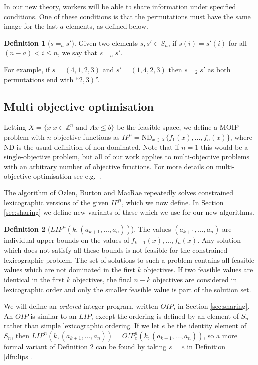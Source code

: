 \documentclass{amsart}
\theoremstyle{definition}
\newtheorem{dfn}{Definition}
\begin{document}
In our new theory, workers will be able to share information under specified conditions.
One of these conditions is that the permutations must have the same image for the last $a$ elements, as defined below.
\begin{dfn}[$s =_a s'$]
  Given two elements $s, s' \in S_n$, if $s(i) = s'(i)$ for all $(n-a) < i \leq n$, we say that $s =_a s'$.
\end{dfn}
For example, if $s = (4,1,2,3)$ and $s' = (1,4,2,3)$ then $s =_2 s'$ as both permutations end with ``$\left. 2,3\right)$''.

\subsection{Multi objective optimisation}

Letting $X = \{x | x \in {\ensuremath{\mathbb{Z}}}^n \text{ and } Ax \leq b\}$ be the feasible space, we define
a MOIP problem with $n$ objective functions as ${I\!P}^n = \text{ND}_{x\in X} \{f_1(x),\dots,f_n(x)\}$,
where ND is the usual definition of non-dominated.
Note that if $n=1$ this would be a single-objective problem, but all of our work applies to multi-objective problems with an arbitrary number of objective functions.
For more details on multi-objective optimisation see e.g.\ \cite{Przybylski2017,Ehrgott2000Survey}.

The algorithm of Ozlen, Burton and MacRae \cite{Ozlen2014moipaira} repeatedly solves constrained lexicographic versions of the given ${I\!P}^n$, which we now define.
In Section \ref{sec:sharing} we define new variants of these which we use for our new algorithms.

\begin{dfn}[${LI\!P}^n(k, (a_{k+1},\dots,a_n))$]\label{dfn:lip}
The values $(a_{k+1},\dots,a_n)$ are individual upper bounds on the values of $f_{k+1}(x),\dots,f_n(x)$.
Any solution which does not satisfy all these bounds is not feasible for the constrained lexicographic problem.
The set of solutions to such a problem contains all feasible values which are not dominated in the first $k$ objectives.
If two feasible values are identical in the first $k$ objectives, the final $n-k$ objectives are considered in lexicographic order and only the smaller feasible value is part of the solution set.
\end{dfn}

We will define an {\em ordered} integer program, written ${O\!I\!P}$, in Section \ref{sec:sharing}.
An ${O\!I\!P}$ is similar to an ${LI\!P}$, except the ordering is defined by an element of $S_n$ rather than simple lexicographic ordering.
If we let $e$ be the identity element of $S_n$, then 
${LI\!P}^n(k, (a_{k+1},\dots,a_n)) = {O\!I\!P}^n_e(k, (a_{k+1}, \dots, a_n))$, so
a more formal variant of Definition \ref{dfn:lip} can be found by taking $s=e$ in Definition \ref{dfn:lips}.
\end{document}
